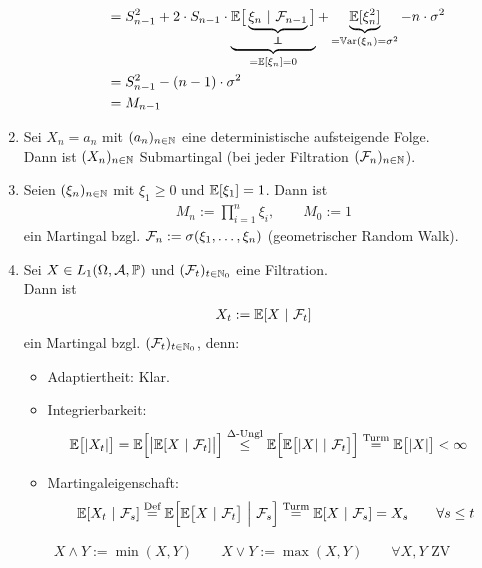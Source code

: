 \begin{beisp}
\begin{enumerate}[label=(\alph*)]
\begin{itemize}
\begin{align*}
&=S_{n-1}^2+2\cdot S_{n-1}\cdot \underbrace{\E\big[\underbrace{\xi_n~|~\F_{n-1}}_{\unab}\big]}_{=\E[\xi_n]=0}+\underbrace{\E[\xi_n^2]}_{=\Var(\xi_n)=\sigma^2}-n\cdot\sigma^2\\
&=S_{n-1}^2-(n-1)\cdot\sigma^2\\
&=M_{n-1}
\end{align*}
\end{itemize}
\item Sei $X_n=a_n$ mit $(a_n)_{n\in\mathbb{N}}$ eine deterministische aufsteigende Folge.\\
Dann ist $(X_n)_{n\in\mathbb{N}}$ Submartingal (bei jeder Filtration $(\mathcal{F}_n)_{n\in\mathbb{N}}$).
\item Seien $(\xi_n)_{n\in\mathbb{N}}$ mit $\xi_1\geq0$ und $\mathbb{E}[\xi_1]=1$. Dann ist
\begin{align*}
M_n:=\prod\limits_{i=1}^n\xi_i,\qquad M_0:=1
\end{align*}
ein Martingal bzgl. $\mathcal{F}_n:=\sigma(\xi_1,\ldots,\xi_n)$ (geometrischer Random Walk).
\item Sei $X\in L_1(\Omega,\mathcal{A},\mathbb{P})$ und $(\mathcal{F}_t)_{t\in\mathbb{N}_0}$ eine Filtration.\\
Dann ist
\begin{align*}
X_t:=\mathbb{E}[X~|~\mathcal{F}_t]
\end{align*}
ein Martingal bzgl. $(\mathcal{F}_t)_{t\in\mathbb{N}_0}$, denn:
\begin{itemize}
\item Adaptiertheit: Klar.
\item Integrierbarkeit:
\begin{align*}
\mathbb{E}\big[|X_t|\big]
=\mathbb{E}\Big[\big|\mathbb{E}[X~|~\mathcal{F}_t]\big|\Big]
&\stackrel{\Delta\text{-Ungl}}{\leq}
\mathbb{E}\Big[\mathbb{E}\big[|X|~|~\mathcal{F}_t \big]\Big]
\stackrel{\text{Turm}}{=}
\mathbb{E}\big[|X|\big]
<\infty
\end{align*}
\item Martingaleigenschaft:
\begin{align*}
\mathbb{E}[X_t~|~\mathcal{F}_s]
\stackrel{\text{Def}}{=}\mathbb{E}\Big[\mathbb{E}\big[X~|~\mathcal{F}_t\big]~\Big|~ \mathcal{F}_s\Big]
\stackrel{\text{Turm}}{=}
\mathbb{E}[X~|~\mathcal{F}_s]
=X_s
\qquad\forall s\leq t
\end{align*}
\end{itemize}
\end{enumerate}
\end{beisp}

\begin{notation}
\begin{align*}
X\wedge Y:=\min(X,Y)\qquad X\vee Y:=\max(X,Y)\qquad\forall X,Y\text{ ZV}
\end{align*}
\end{notation}

